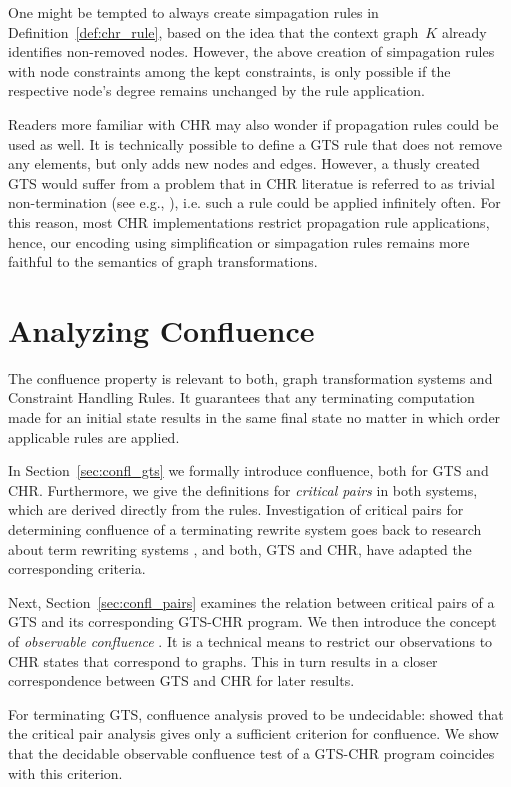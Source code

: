 \documentclass{tlp}
\begin{document}
One might be tempted to always create simpagation rules in
Definition~\ref{def:chr_rule}, based on the idea that the context graph~$K$
already identifies non-removed nodes. However, the above creation of simpagation
rules with node constraints among the kept constraints, is only possible if the
respective node's degree remains unchanged by the rule application.

Readers more familiar with CHR may also wonder if propagation rules could be used
as well. It is technically possible to define a GTS rule that does not remove any
elements, but only adds new nodes and edges. However, a thusly created GTS would
suffer from a problem that in CHR literatue is referred to as trivial
non-termination (see e.g., \cite{fruehwirth09}), i.e. such a rule could be
applied infinitely often. For this reason, most CHR implementations restrict
propagation rule applications, hence, our encoding using simplification or
simpagation rules remains more faithful to the semantics of graph
transformations.

\section{Analyzing Confluence}
\label{sec:confluence}

The confluence property is relevant to both, graph transformation systems and
Constraint Handling Rules. It guarantees that any terminating computation made
for an initial state results in the same final state no matter in which order
applicable rules are applied.

In Section~\ref{sec:confl_gts} we formally introduce confluence, both for GTS and
CHR. Furthermore, we give the definitions for \emph{critical pairs} in both
systems, which are derived directly from the rules. Investigation of critical
pairs for determining confluence of a terminating rewrite system goes back to
research about term rewriting systems \cite{huet80}, and both, GTS and CHR, have
adapted the corresponding criteria.

Next, Section~\ref{sec:confl_pairs} examines the relation between critical pairs
of a GTS and its corresponding GTS-CHR program. We then introduce the concept of
\emph{observable confluence} \cite{duckstuckeysulzmann07}. It is a technical
means to restrict our observations to CHR states that correspond to graphs. This
in turn results in a closer correspondence between GTS and CHR for later results.

For terminating GTS, confluence analysis proved to be undecidable: \cite{plump05}
showed that the critical pair analysis gives only a sufficient criterion for
confluence. We show that the decidable observable confluence test of a GTS-CHR
program coincides with this criterion.
\end{document}
